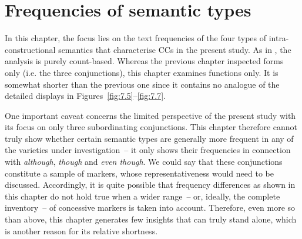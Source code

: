\chapter{Frequencies of semantic types}\label{bkm:Ref487278308}\label{bkm:Ref497550521}\label{bkm:Ref1727470}\label{bkm:Ref34987676}\label{ch:8}\label{sec:8}

In this chapter, the focus lies on the text frequencies of the four types of intra-constructional semantics that characterise CCs in the present study. As in , the analysis is purely count-based. Whereas the previous chapter inspected forms only (i.e. the three conjunctions), this chapter examines functions only. It is somewhat shorter than the previous one since it contains no analogue of the detailed displays in Figures~\ref{fig:7.5}–\ref{fig:7.7}.

One important caveat concerns the limited perspective of the present study with its focus on only three subordinating conjunctions. This chapter therefore cannot truly show whether certain semantic types are generally more frequent in any of the varieties under investigation~– it only shows their frequencies in connection with \textit{although}, \textit{though} and \textit{even though}. We could say that these conjunctions constitute a sample of markers, whose representativeness would need to be discussed. Accordingly, it is quite possible that frequency differences as shown in this chapter do not hold true when a wider range~– or, ideally, the complete inventory~– of concessive markers is taken into account. Therefore, even more so than  above, this chapter generates few insights that can truly stand alone, which is another reason for its relative shortness.

